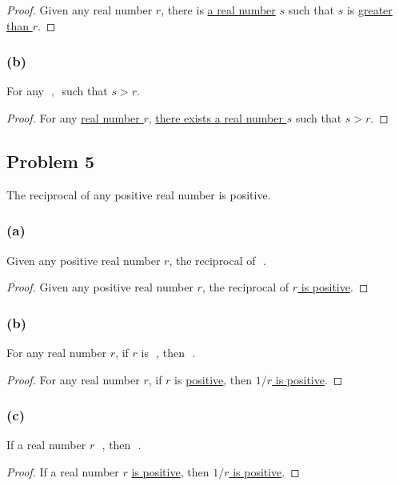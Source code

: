 \documentclass[14pt]{extarticle}
\newcommand{\fbl}{\underline{\hspace{1cm}}\,\,}
\begin{document}
\begin{proof}
    Given any real number $r$, there is \underline{a real number} $s$ such that $s$
    is \underline{greater than $r$}.
\end{proof}

\subsubsection{(b)}
For any \fbl, \fbl such that $s > r$.

\begin{proof}
    For any \underline{real number $r$}, \underline{there exists a real number $s$}
    such that $s > r$.
\end{proof}

\subsection{Problem 5}
The reciprocal of any positive real number is positive.

\subsubsection{(a)}
Given any positive real number $r$, the reciprocal of \fbl.

\begin{proof}
    Given any positive real number $r$, the reciprocal of \underline{$r$ is positive}.
\end{proof}

\subsubsection{(b)}
For any real number $r$, if $r$ is \fbl, then \fbl.

\begin{proof}
    For any real number $r$, if $r$ is \underline{positive}, then \underline{$1/r$
        is positive}.
\end{proof}

\subsubsection{(c)}
If a real number $r$ \fbl, then \fbl.

\begin{proof}
    If a real number $r$ \underline{is positive}, then \underline{$1/r$ is
        positive}.
\end{proof}
\end{document}

